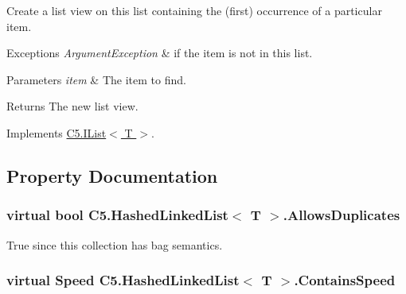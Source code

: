 Create a list view on this list containing the (first) occurrence of a particular item. 


\begin{DoxyExceptions}{Exceptions}
{\em Argument\+Exception} & if the item is not in this list.\\
\hline
\end{DoxyExceptions}

\begin{DoxyParams}{Parameters}
{\em item} & The item to find.\\
\hline
\end{DoxyParams}
\begin{DoxyReturn}{Returns}
The new list view.
\end{DoxyReturn}


Implements \hyperlink{interface_c5_1_1_i_list_aefcdef9983913d18ae05394e77a44c71}{C5.\+I\+List$<$ T $>$}.



\subsection{Property Documentation}
\hypertarget{class_c5_1_1_hashed_linked_list_a0a771fb597422ba1c79972188d9102fa}{}
\subsubsection[{Allows\+Duplicates}]{\setlength{\rightskip}{0pt plus 5cm}virtual bool {\bf C5.\+Hashed\+Linked\+List}$<$ T $>$.Allows\+Duplicates\hspace{0.3cm}{\ttfamily [get]}}\label{class_c5_1_1_hashed_linked_list_a0a771fb597422ba1c79972188d9102fa}




True since this collection has bag semantics.\hypertarget{class_c5_1_1_hashed_linked_list_adfd49be207b1d5fe11d101a27ce194f1}{}
\subsubsection[{Contains\+Speed}]{\setlength{\rightskip}{0pt plus 5cm}virtual {\bf Speed} {\bf C5.\+Hashed\+Linked\+List}$<$ T $>$.Contains\+Speed\hspace{0.3cm}{\ttfamily [get]}}\label{class_c5_1_1_hashed_linked_list_adfd49be207b1d5fe11d101a27ce194f1}


